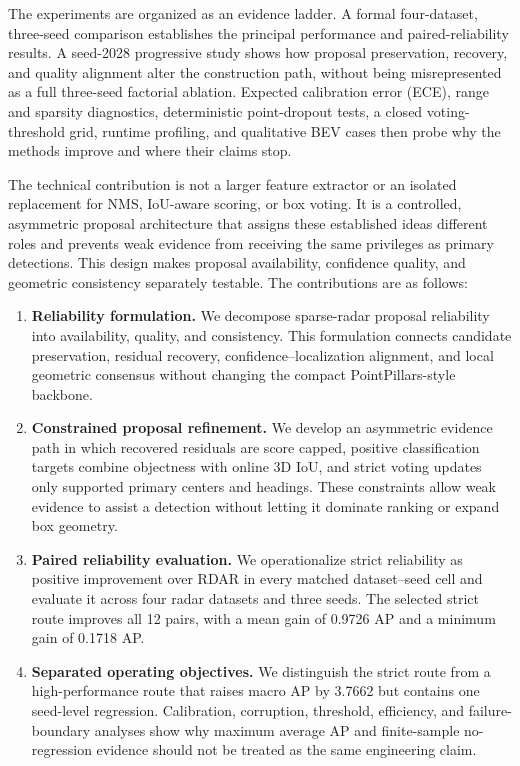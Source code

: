 \documentclass[final,5p,times]{elsarticle}
\begin{document}
The experiments are organized as an evidence ladder. A formal
four-dataset, three-seed comparison establishes the principal performance and
paired-reliability results. A seed-2028 progressive study shows how proposal
preservation, recovery, and quality alignment alter the construction path,
without being misrepresented as a full three-seed factorial ablation. Expected
calibration error (ECE), range and sparsity diagnostics, deterministic
point-dropout tests, a closed voting-threshold grid, runtime profiling, and
qualitative BEV cases then probe why the methods improve and where their claims
stop.

The technical contribution is not a larger feature extractor or an isolated
replacement for NMS, IoU-aware scoring, or box voting. It is a controlled,
asymmetric proposal architecture that assigns these established ideas
different roles and prevents weak evidence from receiving the same privileges
as primary detections. This design makes proposal availability, confidence
quality, and geometric consistency separately testable. The contributions are
as follows:
\begin{enumerate}[leftmargin=*]
\item \textbf{Reliability formulation.} We decompose sparse-radar proposal
reliability into availability, quality, and consistency. This formulation
connects candidate preservation, residual recovery, confidence--localization
alignment, and local geometric consensus without changing the compact
PointPillars-style backbone.
\item \textbf{Constrained proposal refinement.} We develop an asymmetric
evidence path in which recovered residuals are score capped, positive
classification targets combine objectness with online 3D IoU, and strict
voting updates only supported primary centers and headings. These constraints
allow weak evidence to assist a detection without letting it dominate ranking
or expand box geometry.
\item \textbf{Paired reliability evaluation.} We operationalize strict
reliability as positive improvement over RDAR in every matched dataset--seed
cell and evaluate it across four radar datasets and three seeds. The selected
strict route improves all 12 pairs, with a mean gain of 0.9726 AP and a minimum
gain of 0.1718 AP.
\item \textbf{Separated operating objectives.} We distinguish the strict route
from a high-performance route that raises macro AP by 3.7662 but contains one
seed-level regression. Calibration, corruption, threshold, efficiency, and
failure-boundary analyses show why maximum average AP and finite-sample
no-regression evidence should not be treated as the same engineering claim.
\end{enumerate}
\end{document}
